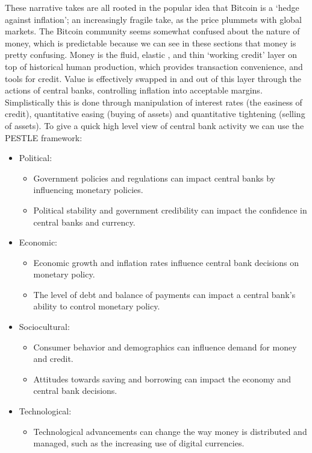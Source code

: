 \begin{itemize}
These narrative takes are all rooted in the popular idea that Bitcoin is a `hedge against inflation'; an increasingly fragile take, as the price plummets with global markets. The Bitcoin community seems somewhat confused about the nature of money, which is predictable because we can see in these sections that money is pretty confusing. Money is the fluid, elastic \cite{cagan1958demand}, and thin `working credit' layer on top of historical human production, which provides transaction convenience, and tools for credit. Value is effectively swapped in and out of this layer through the actions of central banks, controlling inflation into acceptable margins. Simplistically this is done through manipulation of interest rates (the easiness of credit), quantitative easing (buying of assets) and quantitative tightening (selling of assets). To give a quick high level view of central bank activity we can use the PESTLE framework:
\begin{itemize}
\item Political:
\begin{itemize}
\item Government policies and regulations can impact central banks by influencing monetary policies.
\item Political stability and government credibility can impact the confidence in central banks and currency.
\end{itemize}
\item Economic:
\begin{itemize}
\item Economic growth and inflation rates influence central bank decisions on monetary policy.
\item The level of debt and balance of payments can impact a central bank's ability to control monetary policy.
\end{itemize}
\item Sociocultural:
\begin{itemize}
\item Consumer behavior and demographics can influence demand for money and credit.
\item Attitudes towards saving and borrowing can impact the economy and central bank decisions.
\end{itemize}
\item Technological:
\begin{itemize}
\item Technological advancements can change the way money is distributed and managed, such as the increasing use of digital currencies.

\end{itemize}
\end{itemize}
\end{itemize}
